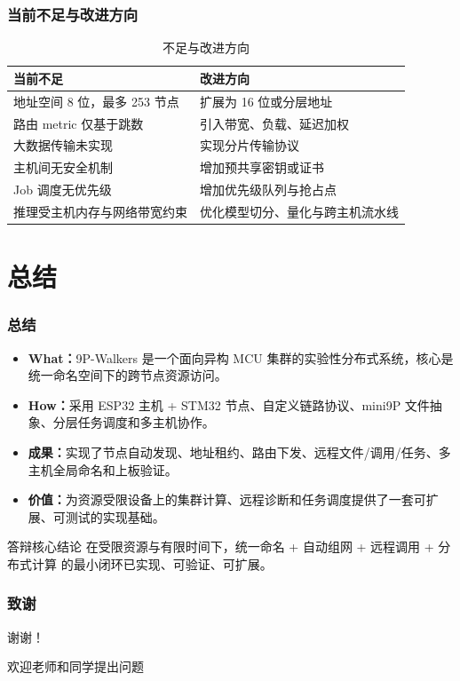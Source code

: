 \documentclass[aspectratio=169]{ctexbeamer}
\begin{document}
\begin{frame}
  \frametitle{当前不足与改进方向}
  \begin{table}
    \centering
    \small
    \begin{tabular}{|p{}|p{}|}
      \hline
      \textbf{当前不足} & \textbf{改进方向} \\
      \hline
      地址空间 8 位，最多 253 节点 & 扩展为 16 位或分层地址 \\
      \hline
      路由 metric 仅基于跳数 & 引入带宽、负载、延迟加权 \\
      \hline
      大数据传输未实现 & 实现分片传输协议 \\
      \hline
      主机间无安全机制 & 增加预共享密钥或证书 \\
      \hline
      Job 调度无优先级 & 增加优先级队列与抢占点 \\
      \hline
      推理受主机内存与网络带宽约束 & 优化模型切分、量化与跨主机流水线 \\
      \hline
    \end{tabular}
    \caption{不足与改进方向}
  \end{table}
\end{frame}

\section{总结}

\begin{frame}
  \frametitle{总结}
  \begin{itemize}
    \item \textbf{What：}9P-Walkers 是一个面向异构 MCU 集群的实验性分布式系统，核心是统一命名空间下的跨节点资源访问。
    \item \textbf{How：}采用 ESP32 主机 + STM32 节点、自定义链路协议、mini9P 文件抽象、分层任务调度和多主机协作。
    \item \textbf{成果：}实现了节点自动发现、地址租约、路由下发、远程文件/调用/任务、多主机全局命名和上板验证。
    \item \textbf{价值：}为资源受限设备上的集群计算、远程诊断和任务调度提供了一套可扩展、可测试的实现基础。
  \end{itemize}
  \vspace{0.3cm}
  \begin{alertblock}{答辩核心结论}
    \centering
    在受限资源与有限时间下，\alert{统一命名 + 自动组网 + 远程调用 + 分布式计算} 的最小闭环已实现、可验证、可扩展。
  \end{alertblock}
\end{frame}

\begin{frame}
  \frametitle{致谢}
  \centerline{\Large 谢谢！}
  \vspace{0.4cm}
  \centerline{\normalsize 欢迎老师和同学提出问题}
\end{frame}
\end{document}
